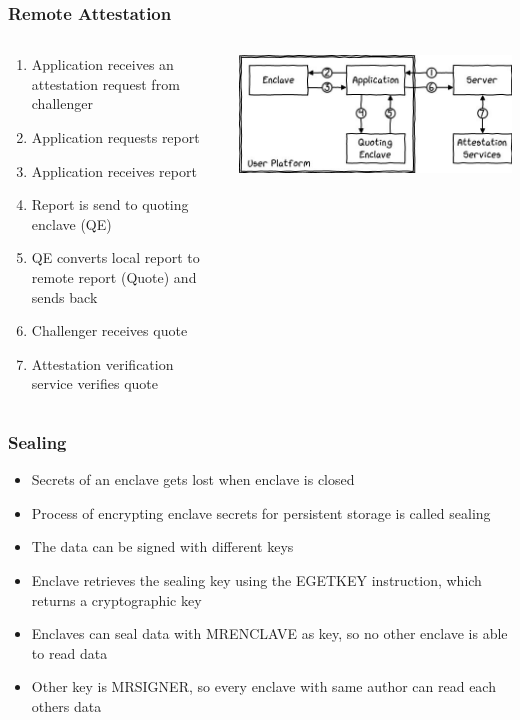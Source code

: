 \begin{frame}
    \frametitle{Remote Attestation}
    \begin{columns}
        \begin{column}{0.4\textwidth}
            \begin{enumerate}[<+->]
                \item Application receives an attestation request from challenger
                \item Application requests report
                \item Application receives report
                \item Report is send to quoting enclave (QE)
                \item QE converts local report to remote report (Quote) and sends back
                \item Challenger receives quote
                \item Attestation verification service verifies quote
            \end{enumerate}
        \end{column}
        \begin{column}{0.6\textwidth}
            \includegraphics[scale=0.4]{Images/remote_attestation.png}
        \end{column}
    \end{columns}
\end{frame}

\begin{frame}
    \frametitle{Sealing}
    \begin{itemize}[<+->]
        \item Secrets of an enclave gets lost when enclave is closed
        \item Process of encrypting enclave secrets for persistent storage is called sealing
        \item The data can be signed with different keys
        \item Enclave retrieves the sealing key using the EGETKEY instruction, which returns a cryptographic key
        \item Enclaves can seal data with MRENCLAVE as key, so no other enclave is able to read data
        \item Other key is MRSIGNER, so every enclave with same author can read each others data
    \end{itemize}
\end{frame}